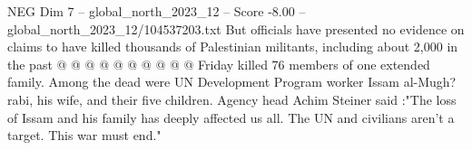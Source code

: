 \begin{textsample}{NEG Dim 7 – global\_north\_2023\_12 – Score -8.00 – global\_north\_2023\_12/104537203.txt}
But officials have presented no evidence on claims to have killed thousands of Palestinian militants, including about 2,000 in the past @ @ @ @ @ @ @ @ @ @ Friday killed 76 members of one extended family.
Among the dead were UN Development Program worker Issam al-Mugh? rabi, his wife, and their five children.
Agency head Achim Steiner said :"The loss of Issam and his family has deeply affected us all.
The UN and civilians aren't a target.
This war must end."

\end{textsample}
